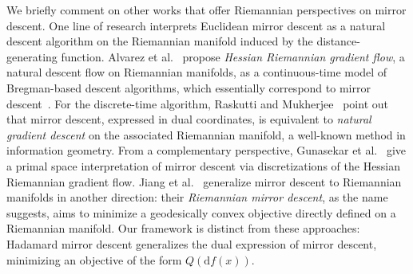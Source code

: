 \documentclass[11pt,letterpaper]{article}
\numberwithin{equation}{section}
\newcommand{\RR}{\mathbb{R}}
\newcommand{\diff}{\mathrm{d}}
\begin{document}
We briefly comment on other works that offer Riemannian perspectives on mirror descent.
One line of research interprets Euclidean mirror descent as a natural descent algorithm on the Riemannian manifold induced by the distance-generating function.
Alvarez et al.~\cite{Hessian-Riemannian} propose \emph{Hessian Riemannian gradient flow}, a natural descent flow on Riemannian manifolds, as a continuous-time model of Bregman-based descent algorithms, which essentially correspond to mirror descent~\cite{BT2003}.
For the discrete-time algorithm, Raskutti and Mukherjee~\cite{Raskutti-15} point out that mirror descent, expressed in dual coordinates, is equivalent to \emph{natural gradient descent} on the associated Riemannian manifold, a well-known method in information geometry.
From a complementary perspective, Gunasekar et al.~\cite{Gunasekar-21} give a primal space interpretation of mirror descent via discretizations of the Hessian Riemannian gradient flow.
Jiang et al.~\cite{Jiang-26} generalize mirror descent to Riemannian manifolds in another direction: their \emph{Riemannian mirror descent}, as the name suggests, aims to minimize a geodesically convex objective directly defined on a Riemannian manifold.
Our framework is distinct from these approaches: Hadamard mirror descent generalizes the dual expression of mirror descent, minimizing an objective of the form $Q(\diff f(x))$.

\end{document}
